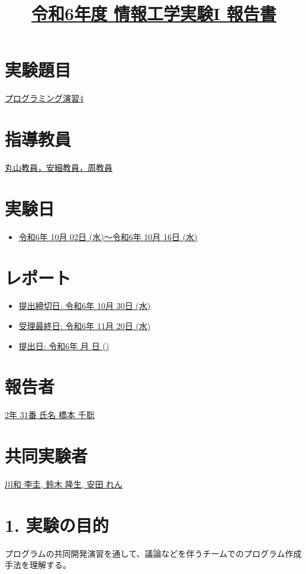 \documentclass[lualatex, ja=standard, a4j, 12pt]{bxjsarticle}
\title{\underline{令和6年度 情報工学実験I 報告書}}
\date{}
\begin{document}
\maketitle
\section*{実験題目}
\underline{プログラミング演習4}

\section*{指導教員}
\underline{丸山教員，安細教員，周教員}

\section*{実験日}
\begin{itemize}[left=2em]
    \item \underline{令和6年 10月 02日 (水)〜令和6年 10月 16日 (水)}
\end{itemize}

\section*{レポート}
\begin{itemize}[left=2em]
    \item \underline{提出締切日: 令和6年 10月 30日 (水)}
    \item \underline{受理最終日: 令和6年 11月 20日 (水)}
    \item \underline{提出日: 令和6年 \underline{\hspace{1cm}} 月 \underline{\hspace{1cm}} 日 (\underline{\hspace{1cm}})}
\end{itemize}

\section*{報告者}
\underline{2年 31番 氏名 橋本 千聡}

\section*{共同実験者}
\underline{川和 李圭, 鈴木 隆生, 安田 れん}

\newpage


\section*{1. 実験の目的}
プログラムの共同開発演習を通して、議論などを伴うチームでのプログラム作成手法を理解する。
\end{document}
